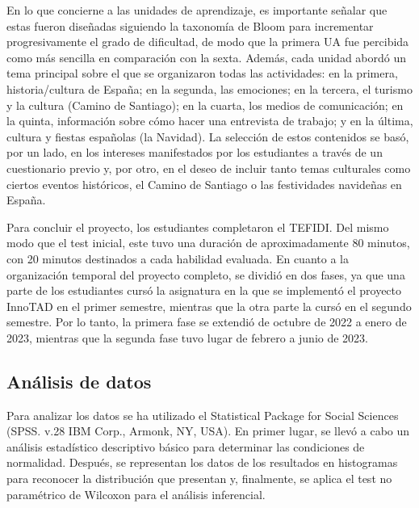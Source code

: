\documentclass[spanish]{textolivre}
\begin{document}
En lo que concierne a las unidades de aprendizaje, es importante señalar que estas fueron diseñadas siguiendo la taxonomía de Bloom \cite{anderson2001} para incrementar progresivamente el grado de dificultad, de modo que la primera UA fue percibida como más sencilla en comparación con la sexta. Además, cada unidad abordó un tema principal sobre el que se organizaron todas las actividades: en la primera, historia/cultura de España; en la segunda, las emociones; en la tercera, el turismo y la cultura (Camino de Santiago); en la cuarta, los medios de comunicación; en la quinta, información sobre cómo hacer una entrevista de trabajo; y en la última, cultura y fiestas españolas (la Navidad). La selección de estos contenidos se basó, por un lado, en los intereses manifestados por los estudiantes a través de un cuestionario previo y, por otro, en el deseo de incluir tanto temas culturales como ciertos eventos históricos, el Camino de Santiago o las festividades navideñas en España.

Para concluir el proyecto, los estudiantes completaron el TEFIDI. Del mismo modo que el test inicial, este tuvo una duración de aproximadamente 80 minutos, con 20 minutos destinados a cada habilidad evaluada. En cuanto a la organización temporal del proyecto completo, se dividió en dos fases, ya que una parte de los estudiantes cursó la asignatura en la que se implementó el proyecto InnoTAD en el primer semestre, mientras que la otra parte la cursó en el segundo semestre. Por lo tanto, la primera fase se extendió de octubre de 2022 a enero de 2023, mientras que la segunda fase tuvo lugar de febrero a junio de 2023.

\subsection{Análisis de datos}\label{sec-3.4}
Para analizar los datos se ha utilizado el Statistical Package for Social Sciences (SPSS. v.28 IBM Corp., Armonk, NY, USA). En primer lugar, se llevó a cabo un análisis estadístico descriptivo básico para determinar las condiciones de normalidad. Después, se representan los datos de los resultados en histogramas para reconocer la distribución que presentan y, finalmente, se aplica el test no paramétrico de Wilcoxon para el análisis inferencial.
\end{document}
